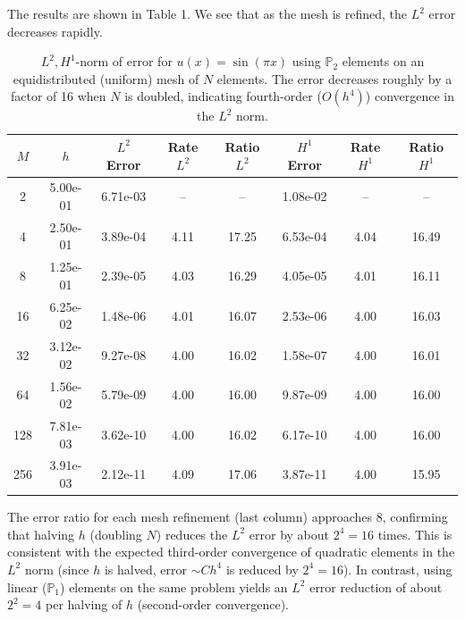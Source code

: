 The results are shown in Table 1.
We see that as the mesh is refined, the \(L^2\) error decreases rapidly.

\begin{table}[h]
	\centering
	\begin{tabular}{|c|c|c|c|c|c|c|c|}
		\hline
		\(M\) & \(h\)    & \(L^2\) Error & Rate \(L^2\) & Ratio \(L^2\) & \(H^1\) Error & Rate \(H^1\) & Ratio \(H^1\) \\
		\hline
		2     & 5.00e-01 & 6.71e-03      & --           & --            & 1.08e-02      & --           & --            \\
		4     & 2.50e-01 & 3.89e-04      & 4.11         & 17.25         & 6.53e-04      & 4.04         & 16.49         \\
		8     & 1.25e-01 & 2.39e-05      & 4.03         & 16.29         & 4.05e-05      & 4.01         & 16.11         \\
		16    & 6.25e-02 & 1.48e-06      & 4.01         & 16.07         & 2.53e-06      & 4.00         & 16.03         \\
		32    & 3.12e-02 & 9.27e-08      & 4.00         & 16.02         & 1.58e-07      & 4.00         & 16.01         \\
		64    & 1.56e-02 & 5.79e-09      & 4.00         & 16.00         & 9.87e-09      & 4.00         & 16.00         \\
		128   & 7.81e-03 & 3.62e-10      & 4.00         & 16.02         & 6.17e-10      & 4.00         & 16.00         \\
		256   & 3.91e-03 & 2.12e-11      & 4.09         & 17.06         & 3.87e-11      & 4.00         & 15.95         \\
		\hline
	\end{tabular}
	\caption{\(L^2,H^1\)-norm of error for \(u(x)=\sin(\pi x)\) using \(\mathbb{P}_2 \) elements on an equidistributed (uniform) mesh of \(N\) elements. The error decreases roughly by a factor of 16 when \(N\) is doubled, indicating fourth-order (\(O(h^4)\)) convergence in the \(L^2\) norm.}
	\label{tab:convergence}
\end{table}

The error ratio for each mesh refinement (last column) approaches 8, confirming that halving \(h\) (doubling \(N\)) reduces the \(L^2\) error by about \(2^4=16\) times.
This is consistent with the expected third-order convergence of quadratic elements in the \(L^2\) norm (since \(h\) is halved, error \(\sim Ch^4\) is reduced by \(2^4=16\)).
In contrast, using linear (\(\mathbb{P}_1\)) elements on the same problem yields an \(L^2\) error reduction of about \(2^2=4\) per halving of \(h\) (second-order convergence).

